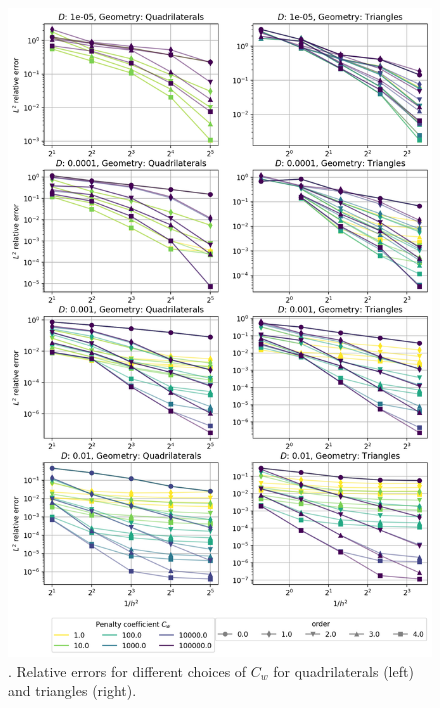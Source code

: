 \begin{figure}[p!]
	\centering
	\includegraphics[height=\textheight]{../figs/parametric/advdiff_2D/quarteroni2.png}
	\caption{. Relative errors for different choices of $C_w$ for 
	quadrilaterals (left) and triangles (right).}
	\label{fig:conv_qart2}
\end{figure}

